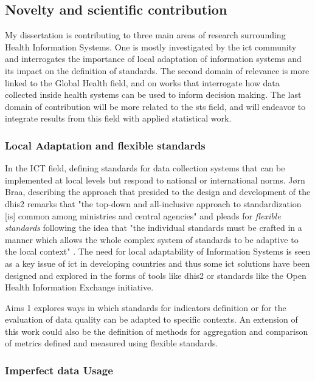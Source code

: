 \subsection{Novelty and scientific contribution}

My dissertation is contributing to three main areas of research surrounding Health Information Systems. One is mostly investigated by the \gls{ict} community and interrogates the importance of local adaptation of information systems and its impact on the definition of standards. The second domain of relevance is more linked to the Global Health field, and on works that interrogate how data collected inside health systems can be used to inform decision making. The last domain of contribution will be more related to the \gls{sts} field, and will endeavor to integrate results from this field with applied statistical work.

\subsubsection{Local Adaptation and flexible standards}

In the ICT field, defining standards for data collection systems that can be implemented at local levels but respond to national or international norms. Jørn Braa, describing the approach that presided to the design and development of the \gls{dhis2} remarks that "the top-down and all-inclusive approach to standardization [is] common among ministries and central agencies" and pleads for \textit{flexible standards} following the idea that "the individual standards must be crafted in a manner which allows the whole complex system of standards to be adaptive to the local context" \citep{braa_developing_2007}. The need for local adaptability of Information Systems is seen as a key issue of \gls{ict} in developing countries \citep{macfarlane_harmonizing_2005,walsham_research_2006,walsham_foreword:_2007,jacucci_standardization_2006} and thus some \gls{ict} solutions have been designed and explored in the forms of tools like \gls{dhis2} or standards like the Open Health Information Exchange initiative.

Aims 1 explores ways in which standards for indicators definition or for the evaluation of data quality can be adapted to specific contexts. An extension of this work could also be the definition of methods for aggregation and comparison of metrics defined and measured using flexible standards.

\subsubsection{Imperfect data Usage}


